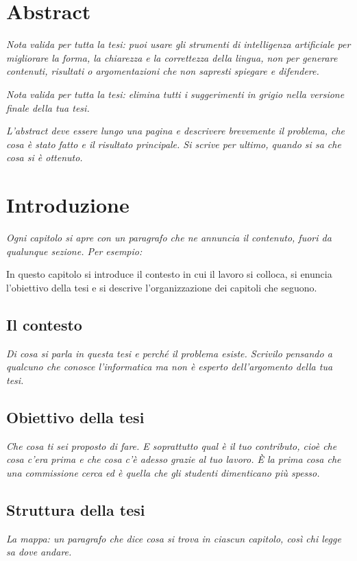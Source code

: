 \documentclass[12pt,a4paper,oneside]{report}
\newcommand{\guida}[1]{{\itshape\color{gray}#1\par}}
\newcommand{\esempio}[1]{#1\par}
\begin{document}


\tableofcontents
\listoffigures
\listoftables

\chapter*{Abstract}
\guida{Nota valida per tutta la tesi: puoi usare gli strumenti di intelligenza artificiale per migliorare la forma, la chiarezza e la correttezza della lingua, non per generare contenuti, risultati o argomentazioni che non sapresti spiegare e difendere.}
\guida{Nota valida per tutta la tesi: elimina tutti i suggerimenti in grigio
nella versione finale della tua tesi.}
\guida{L'abstract deve essere lungo una pagina e descrivere brevemente il problema, che cosa è stato fatto e il risultato principale. Si scrive per ultimo, quando si sa che cosa si è ottenuto.}

\chapter{Introduzione}
\guida{Ogni capitolo si apre con un paragrafo che ne annuncia il contenuto,
fuori da qualunque sezione. Per esempio:}
\esempio{In questo capitolo si introduce il contesto in cui il lavoro si
colloca, si enuncia l'obiettivo della tesi e si descrive l'organizzazione dei
capitoli che seguono.}

\section{Il contesto}
\guida{Di cosa si parla in questa tesi e perché il problema esiste. Scrivilo pensando a qualcuno
che conosce l'informatica ma non è esperto dell'argomento della tua tesi.}

\section{Obiettivo della tesi}
\guida{Che cosa ti sei proposto di fare. E soprattutto qual è il tuo
contributo, cioè che cosa c'era prima e che cosa c'è adesso grazie al tuo
lavoro. È la prima cosa che una commissione cerca ed è quella che gli studenti
dimenticano più spesso.}

\section{Struttura della tesi}
\guida{La mappa: un paragrafo che dice cosa si trova in ciascun capitolo, così
chi legge sa dove andare.}
\end{document}
